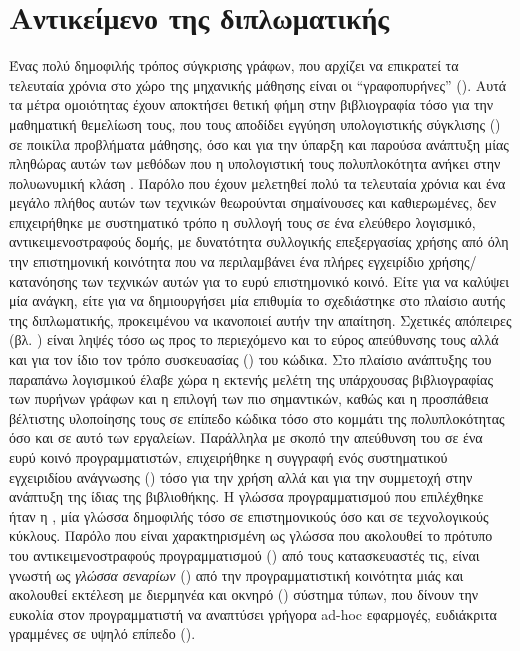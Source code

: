\section{Αντικείμενο της διπλωματικής}
Ένας πολύ δημοφιλής τρόπος σύγκρισης γράφων, που αρχίζει να επικρατεί τα τελευταία χρόνια στο χώρο της μηχανικής μάθησης είναι οι ``γραφοπυρήνες'' ().
Αυτά τα μέτρα ομοιότητας έχουν αποκτήσει θετική φήμη στην βιβλιογραφία τόσο για την μαθηματική θεμελίωση τους, που τους αποδίδει εγγύηση υπολογιστικής σύγκλισης () σε ποικίλα προβλήματα μάθησης, όσο και για την ύπαρξη και παρούσα ανάπτυξη μίας πληθώρας αυτών των μεθόδων που η υπολογιστική τους πολυπλοκότητα ανήκει στην πολυωνυμική κλάση .
Παρόλο που έχουν μελετηθεί πολύ τα τελευταία χρόνια και ένα μεγάλο πλήθος αυτών των τεχνικών θεωρούνται σημαίνουσες και καθιερωμένες, δεν επιχειρήθηκε με συστηματικό τρόπο η συλλογή τους σε ένα ελεύθερο λογισμικό, αντικειμενοστραφούς δομής, με δυνατότητα συλλογικής επεξεργασίας χρήσης από όλη την επιστημονική κοινότητα που να περιλαμβάνει ένα πλήρες εγχειρίδιο χρήσης/κατανόησης των τεχνικών αυτών για το ευρύ επιστημονικό κοινό.
Είτε για να καλύψει μία ανάγκη, είτε για να δημιουργήσει μία επιθυμία το \textbf{} σχεδιάστηκε στο πλαίσιο αυτής της διπλωματικής, προκειμένου να ικανοποιεί αυτήν την απαίτηση.
Σχετικές απόπειρες (βλ. \cite{sugiyama2017graphkernels}) είναι ληψές τόσο ως προς το περιεχόμενο και το εύρος απεύθυνσης τους αλλά και για τον ίδιο τον τρόπο συσκευασίας () του κώδικα.
Στο πλαίσιο ανάπτυξης του παραπάνω λογισμικού έλαβε χώρα η εκτενής μελέτη της υπάρχουσας βιβλιογραφίας των πυρήνων γράφων και η επιλογή των πιο σημαντικών, καθώς και η προσπάθεια βέλτιστης υλοποίησης τους σε επίπεδο κώδικα τόσο στο κομμάτι της πολυπλοκότητας όσο και σε αυτό των εργαλείων.
Παράλληλα με σκοπό την απεύθυνση του σε ένα ευρύ κοινό προγραμματιστών, επιχειρήθηκε η συγγραφή ενός συστηματικού εγχειριδίου ανάγνωσης () τόσο για την χρήση αλλά και για την συμμετοχή στην ανάπτυξη της ίδιας της βιβλιοθήκης.
Η γλώσσα προγραμματισμού που επιλέχθηκε ήταν η , μία γλώσσα δημοφιλής τόσο σε επιστημονικούς όσο και σε τεχνολογικούς κύκλους.
Παρόλο που είναι χαρακτηρισμένη ως γλώσσα που ακολουθεί το πρότυπο του αντικειμενοστραφούς προγραμματισμού () από τους κατασκευαστές τις, είναι γνωστή ως \textit{γλώσσα σεναρίων} () από την προγραμματιστική κοινότητα μιάς και ακολουθεί εκτέλεση με διερμηνέα και οκνηρό () σύστημα τύπων, που δίνουν την ευκολία στον προγραμματιστή να αναπτύσει γρήγορα ad-hoc εφαρμογές, ευδιάκριτα γραμμένες σε υψηλό επίπεδο ().
